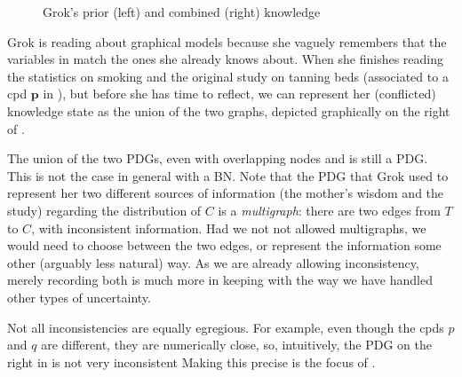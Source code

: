 \documentclass{article}
\newcommand\cmergearr[4]{
		\draw[arr,-] (#1) -- (#4) -- (#2);
		\draw[arr, shorten <=0] (#4) -- (#3);
	}
\newcommand\mergearr[3]{
		\coordinate (center-#1#2#3) at (barycentric cs:#1=1,#2=1,#3=1.2);
		\cmergearr{#1}{#2}{#3}{center-#1#2#3}
	}
\theoremstyle{plain}
\theoremstyle{definition}
\theoremstyle{remark}
\newcommand\mat[1]{\mathbf{#1}}
\numberwithin{equation}{section}
\begin{document}
\begin{example}
\begin{figure}
{
	}
	\caption{\small Grok's prior (left) and combined (right) knowledge}
	\label{fig:grok-combine}
\end{figure}

Grok is reading about graphical models because she vaguely remembers that the
variables in  match the ones she already knows about. When she
finishes reading the statistics on smoking and the original study on tanning
beds (associated to a cpd $\mat p$ in ), but before she has
time to reflect, we can represent her (conflicted) knowledge state as the union
of the two graphs, depicted graphically on the right of .  

The union of the two PDGs, even with overlapping nodes and is still a PDG. This
is not the case in general with a BN. Note that the PDG that Grok used to
represent her two different sources of information (the mother's wisdom and the
study) regarding the distribution of $C$ is a \emph{multigraph}: there are two
edges from $T$ to $C$, with inconsistent information. Had we not not allowed
multigraphs, we would need to choose between the two edges, or represent the
information some other (arguably less natural) way. As we are already allowing
inconsistency, merely recording both is much more in keeping with the way we
have handled other types of uncertainty. 
%		
\end{example}

Not all inconsistencies are equally egregious. For example, even though the cpds
$p$ and $q$ are different, they are numerically close, so, intuitively, the PDG on the right in
 is not very inconsistent%
Making this precise 
is
the focus of .
\end{document}
